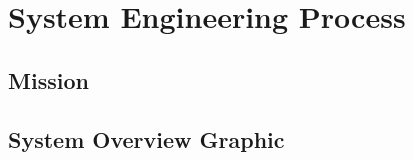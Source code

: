 %
\thispagestyle{fancy}
\chapter{System Engineering Process}
\label{chp:se_process}


\section{Mission}

\section{System Overview Graphic}

